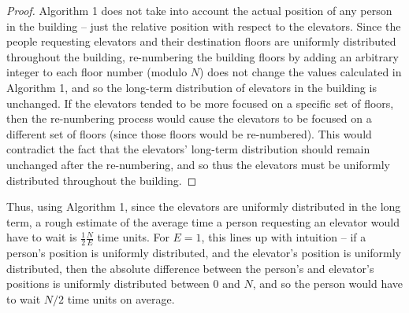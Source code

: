 \documentclass[letterpaper]{article} %
\begin{document}
\begin{proof}
	Algorithm 1 does not take into account the actual position of any person in the building -- just the relative position with respect to the elevators. Since the people requesting elevators and their destination floors are uniformly distributed throughout the building, re-numbering the building floors by adding an arbitrary integer to each floor number (modulo $N$) does not change the values calculated in Algorithm 1, and so the long-term distribution of elevators in the building is unchanged. If the elevators tended to be more focused on a specific set of floors, then the re-numbering process would cause the elevators to be focused on a different set of floors (since those floors would be re-numbered). This would contradict the fact that the elevators' long-term distribution should remain unchanged after the re-numbering, and so thus the elevators must be uniformly distributed throughout the building. 
\end{proof}

Thus, using Algorithm 1, since the elevators are uniformly distributed in the long term, a rough estimate of the average time a person requesting an elevator would have to wait is $\frac{1}{2}\frac{N}{E}$ time units. For $E = 1$, this lines up with intuition -- if a person's position is uniformly distributed, and the elevator's position is uniformly distributed, then the absolute difference between the person's and elevator's positions is uniformly distributed between $0$ and $N$, and so the person would have to wait $N/2$ time units on average. 
\end{document}

